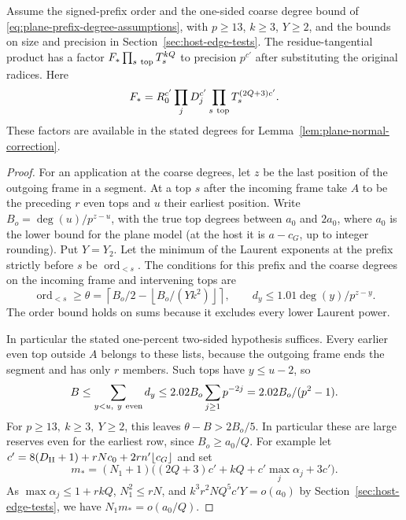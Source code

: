 \begin{lemma}\label{lem:plane-determinant-reserve}
Assume the signed-prefix order and the one-sided coarse degree
bound of \eqref{eq:plane-prefix-degree-assumptions}, with
\(p\ge13\), \(k\ge3\), \(Y\ge2\), and the bounds on size and precision in Section~\ref{sec:host-edge-tests}.
The residue-tangential product has a factor
\(F_*\prod_{s\ {\rm top}}T_s^{kQ}\) to precision \(p^{c'}\)
after substituting the original radices. Here
\[
 F_*=R_0^{c'}\prod_jD_j^{c'}
                         \prod_{s\ {\rm top}}T_s^{(2Q+3)c'} .
\]
These factors are available in the stated degrees for
Lemma~\ref{lem:plane-normal-correction}.
\end{lemma}

\begin{proof}
For an application at the coarse degrees, let \(z\) be the last
position of the outgoing frame in a segment. At a top \(s\)
after the incoming frame take \(A\) to be the preceding \(r\)
even tops and \(u\) their earliest position. Write
\(B_o=\deg(u)/p^{z-u}\), with the true top degrees between
\(a_0\) and \(2a_0\), where \(a_0\) is the lower bound for
the plane model (at the host it is \(a-c_G\), up to integer
rounding). Put \(Y=Y_2\). Let the minimum of the Laurent exponents at the
prefix strictly before \(s\) be \(\operatorname{ord}_{<s}\).
The conditions for this prefix and the coarse degrees on the
incoming frame and intervening tops are
\begin{equation}\label{eq:plane-prefix-degree-assumptions}
 \operatorname{ord}_{<s}\ge\theta
      =\left\lceil B_o/2-\left\lfloor B_o/(Yk^2)\right\rfloor\right\rceil,
 \qquad
 d_y\le1.01\deg(y)/p^{z-y}.
\end{equation}
The order bound holds on sums because it excludes every lower
Laurent power.

In particular the stated one-percent two-sided hypothesis suffices.
Every earlier even top outside \(A\) belongs to these lists,
because the outgoing frame ends the segment and has only
\(r\) members. Such tops have \(y\le u-2\), so
\[
 B\le \sum_{y<u,\ y\ {\rm even}} d_y
       \le 2.02 B_o\sum_{j\ge1}p^{-2j}
       =2.02 B_o/(p^2-1).
\]
For \(p\ge13,\ k\ge3,\ Y\ge2\), this leaves
\(\theta-B> 2B_o/5\). In particular these are large
reserves even for the earliest row, since \(B_o\ge a_0/Q\).
For example let \(c'=8(D_{\rm II}+1)+rN c_0+
2rn'\lfloor c_G\rfloor\) and set
\[
 m_*=(N_1+1)\big((2Q+3)c'+kQ+c'\max_j\alpha_j+3c'\big).
\]
As \(\max\alpha_j\le1+rkQ\), \(N_1^2\le rN\), and
\(k^3r^2NQ^5 c'Y=o(a_0)\) by
Section~\ref{sec:host-edge-tests}, we have \(N_1m_*=o(a_0/Q)\).


\end{proof}
